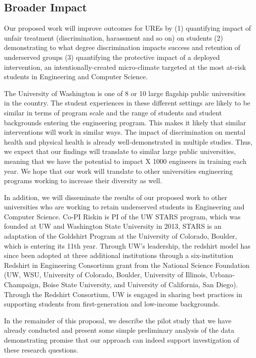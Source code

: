 \subsection{Broader Impact}
\noindent
Our proposed work will improve outcomes for UREs by (1) quantifying impact of unfair treatment (discrimination, harassment and so on)  on students (2) demonstrating to what degree discrimination impacts success and retention of underserved groups (3) quantifying the protective impact of a deployed intervention, an intentionally-created micro-climate targeted at the most at-risk students in Engineering and Computer Science. 

The University of Washington is one of 8 or 10 large flagship public universities in the country. The student experiences in these different settings are likely to be similar in terms of program scale and the range of students and student backgrounds entering the engineering program. This makes it likely that similar interventions will work in similar ways. The impact of discrimination on mental health and physical health is already well-demonstrated in multiple studies. Thus, we expect that our findings will translate to similar large public universities, meaning that we have the potential to impact X 1000 engineers in training each year. We hope that our work will translate to other universities engineering programs working to increase their diversity as well. 

In addition, we will disseminate the results of our proposed work to other universities who are working to retain underserved students in Engineering and Computer Science.  Co-PI Riskin is PI of the UW STARS program, which was founded at UW and Washington State University in 2013,  STARS is an adaptation of the Goldshirt Program at the University of Colorado, Boulder, which is entering its 11th year. Through UW’s leadership, the redshirt model has since been adopted at three additional institutions through a six-institution Redshirt in Engineering Consortium grant from the National Science Foundation (UW, WSU, University of Colorado, Boulder, University of Illinois, Urbana-Champaign, Boise State University, and University of California, San Diego). Through the Redshirt Consortium, UW is engaged in sharing best practices in supporting students from first-generation and low-income backgrounds. 

In the remainder of this proposal, we describe the pilot study that we have already conducted and present some simple preliminary analysis of the data demonstrating promise that our approach can indeed support investigation of these research questions.
 
